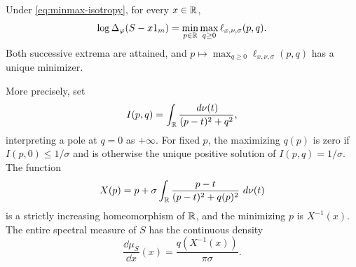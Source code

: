 \begin{proposition}\label{prop:minmax-isotropic}
Under \eqref{eq:minmax-isotropy}, for every $x\in\mathbb R$,
\begin{equation}\label{eq:minmax-isotropic}
 \log\Delta_\varphi(S-x1_m)
 =\min_{p\in\mathbb R}\max_{q\ge0}\ell_{x,\nu,\sigma}(p,q).
\end{equation}
Both successive extrema are attained, and $p\mapsto\max_{q\ge0}\ell_{x,\nu,\sigma}(p,q)$ has a unique minimizer.

More precisely, set
\[
 I(p,q)=\int_\mathbb R\frac{\,d\nu(t)}{(p-t)^2+q^2},
\]
interpreting a pole at $q=0$ as $+\infty$.
For fixed $p$, the maximizing $q(p)$ is zero if $I(p,0)\le1/\sigma$ and is otherwise the unique positive solution of $I(p,q)=1/\sigma$.
The function
\begin{equation}\label{eq:minmax-isotropic-coordinate}
 X(p)=p+\sigma\int_\mathbb R
          \frac{p-t}{(p-t)^2+q(p)^2}\,\,d\nu(t)
\end{equation}
is a strictly increasing homeomorphism of $\mathbb R$, and the minimizing $p$ is $X^{-1}(x)$.
The entire spectral measure of $S$ has the continuous density
\begin{equation}\label{eq:minmax-isotropic-density}
 \frac{\dd\mu_S}{\dd x}(x)
       =\frac{q(X^{-1}(x))}{\pi\sigma}.
\end{equation}
\end{proposition}

